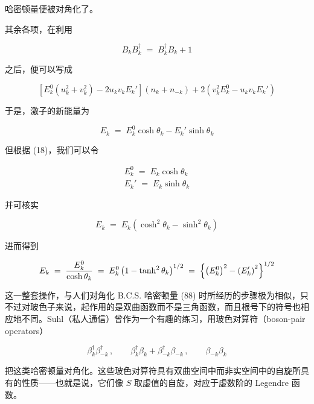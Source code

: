 哈密顿量便被对角化了。

其余各项，在利用

\begin{equation*}
B_k B_k^{\dagger} \;=\; B_k^{\dagger} B_k + 1
\end{equation*}

之后，便可以写成

\begin{equation*}
\left[E_k^{0}\left(u_k^{2} + v_k^{2}\right) - 2u_k v_k E_k'\right]\left(n_k + n_{-k}\right) + 2\left(v_k^{2}E_k^{0} - u_k v_k E_k'\right)
\end{equation*}

于是，激子的新能量为

\begin{equation*}
E_k \;=\; E_k^{0}\cosh\theta_k - E_k'\sinh\theta_k
\end{equation*}

但根据 (18)，我们可以令

\begin{gather*}
E_k^{0} \;=\; E_k\cosh\theta_k \\
E_k' \;=\; E_k\sinh\theta_k
\end{gather*}

并可核实

\begin{equation*}
E_k \;=\; E_k\left(\cosh^{2}\theta_k - \sinh^{2}\theta_k\right)
\end{equation*}

进而得到

\begin{equation*}
E_k \;=\; \frac{E_k^{0}}{\cosh\theta_k} \;=\; E_k^{0}\left(1 - \tanh^{2}\theta_k\right)^{1/2} \;=\; \Bigl\{\left(E_k^{0}\right)^{2} - \left(E_k'\right)^{2}\Bigr\}^{1/2}
\end{equation*}

这一整套操作，与人们对角化 B.C.S. 哈密顿量 (88) 时所经历的步骤极为相似，只不过对玻色子来说，起作用的是双曲函数而不是三角函数，而且根号下的符号也相应地不同。Suhl（私人通信）曾作为一个有趣的练习，用玻色对算符（boson-pair operators）

\begin{equation*}
\beta_k^{\dagger}\beta_{-k}^{\dagger}\,, \qquad \beta_k^{\dagger}\beta_k + \beta_{-k}^{\dagger}\beta_{-k}\,, \qquad \beta_{-k}\beta_k
\end{equation*}

把这类哈密顿量对角化。这些玻色对算符具有双曲空间中而非实空间中的自旋所具有的性质——也就是说，它们像 $S$ 取虚值的自旋，对应于虚数阶的 Legendre 函数。

